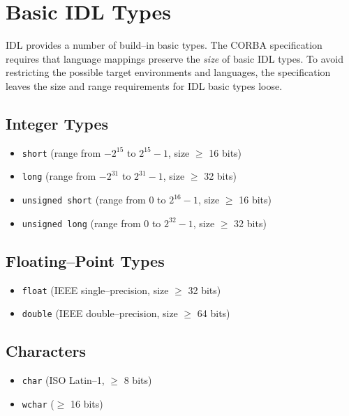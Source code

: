 \section{Basic IDL Types}
IDL provides a number of build--in basic types. 
The CORBA specification requires that language mappings preserve the {\it size}
of basic IDL types.
To avoid restricting the possible target environments and languages, the 
specification leaves the size and range requirements for IDL basic types loose.


\subsection{Integer Types}

\begin{itemize}
  \item {\tt short} (range from $-2^{15}$ to $2^{15}-1$, size $\geq$ 16 bits)
  \item {\tt long} (range from $-2^{31}$ to $2^{31}-1$, size $\geq$ 32 bits)
  \item {\tt unsigned short} (range from $0$ to $2^{16}-1$, size  $\geq$
  16 bits)
  \item {\tt unsigned long} (range from $0$ to $2^{32}-1$, size $\geq$ 32
  bits)
\end{itemize}

\subsection{Floating--Point Types}

\begin{itemize}
  \item {\tt float} (IEEE single--precision, size $\geq$ 32 bits)
  \item {\tt double} (IEEE double--precision, size $\geq$ 64 bits)
\end{itemize}


\subsection{Characters}
\begin{itemize}
  \item {\tt char} (ISO Latin--1, $\geq$ 8 bits)
  \item {\tt wchar} ($\geq$ 16 bits)
\end{itemize}

